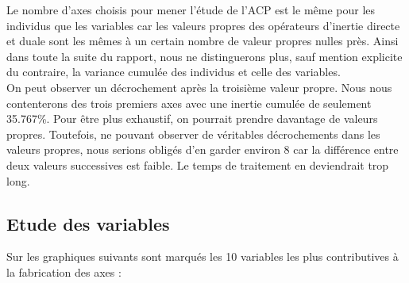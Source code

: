 \documentclass{article}
\begin{document}
Le nombre d'axes choisis pour mener l'étude de l'ACP est le même pour les individus que les variables car les valeurs propres des opérateurs d'inertie directe et duale sont les mêmes à un certain nombre de valeur propres nulles près. Ainsi dans toute la suite du rapport, nous ne distinguerons plus, sauf mention explicite du contraire, la variance cumulée des individus et celle des variables.\\

On peut observer un décrochement après la troisième valeur propre.  Nous nous contenterons des trois premiers axes avec une inertie cumulée de seulement 35.767\%. Pour être plus exhaustif, on pourrait prendre davantage de valeurs propres. Toutefois, ne pouvant observer de véritables décrochements dans les valeurs propres, nous serions obligés d'en garder environ 8 car la différence entre deux valeurs successives est faible. Le temps de traitement en deviendrait trop long.  

\subsection{Etude des variables}

Sur les graphiques suivants sont marqués les 10 variables les plus contributives à la fabrication des axes : 
\end{document}
